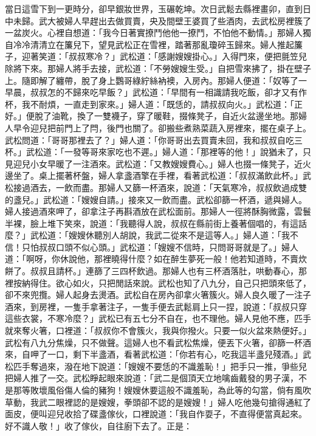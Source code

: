 \begin{showcontents}{}
當日這雪下到一更時分，卻早銀妝世界，玉碾乾坤。次日武鬆去縣裡畫卯，直到日中未歸。武大被婦人早趕出去做買賣，央及間壁王婆買了些酒肉，去武松房裡簇了一盆炭火。心裡自想道：「我今日著實撩鬥他他一撩鬥，不怕他不動情。」那婦人獨自冷冷清清立在簾兒下，望見武松正在雪裡，踏著那亂瓊碎玉歸來。婦人推起簾子，迎著笑道：「叔叔寒冷？」武松道：「感謝嫂嫂掛心。」入得門來，便把氈笠兒除將下來。那婦人將手去接，武松道：「不勞嫂嫂生受。」自把雪來拂了，掛在壁子上。隨即解了纏帶，脫了身上鸚哥綠紵絲衲襖，入房內。那婦人便道：「奴等了一早晨，叔叔怎的不歸來吃早飯？」武松道：「早間有一相識請我吃飯，卻才又有作杯，我不耐煩，一直走到家來。」婦人道：「既恁的，請叔叔向火。」武松道：「正好。」便脫了油靴，換了一雙襪子，穿了暖鞋，掇條凳子，自近火盆邊坐地。那婦人早令迎兒把前門上了閂，後門也關了。卻搬些煮熟菜蔬入房裡來，擺在桌子上。武松問道：「哥哥那裡去了？」婦人道：「你哥哥出去買賣未回，我和叔叔自吃三杯。」武松道：「一發等哥來家吃也不遲。」婦人道：「那裡等的他！」說猶未了，只見迎兒小女早暖了一注酒來。武松道：「又教嫂嫂費心。」婦人也掇一條凳子，近火邊坐了。桌上擺著杯盤，婦人拿盞酒擎在手裡，看著武松道：「叔叔滿飲此杯。」武松接過酒去，一飲而盡。那婦人又篩一杯酒來，說道：「天氣寒冷，叔叔飲過成雙的盞兒。」武松道：「嫂嫂自請。」接來又一飲而盡。武松卻篩一杯酒，遞與婦人。婦人接過酒來呷了，卻拿注子再斟酒放在武松面前。那婦人一徑將酥胸微露，雲鬟半裸，臉上堆下笑來，說道：「我聽得人說，叔叔在縣前街上養著個唱的，有這話麼？」武松道：「嫂嫂休聽別人胡說，我武二從來不是這等人。」婦人道：「我不信！只怕叔叔口頭不似心頭。」武松道：「嫂嫂不信時，只問哥哥就是了。」婦人道：「啊呀，你休說他，那裡曉得什麼？如在醉生夢死一般！他若知道時，不賣炊餅了。叔叔且請杯。」連篩了三四杯飲過。那婦人也有三杯酒落肚，哄動春心，那裡按納得住。欲心如火，只把閒話來說。武松也知了八九分，自己只把頭來低了，卻不來兜攬。婦人起身去燙酒。武松自在房內卻拿火箸簇火。婦人良久暖了一注子酒來，到房裡，一隻手拿著注子，一隻手便去武鬆肩上只一捏，說道：「叔叔只穿這些衣裳，不寒冷麼？」武松已有五七分不自在，也不理他。婦人見他不應，匹手就來奪火箸，口裡道：「叔叔你不會簇火，我與你撥火。只要一似火盆來熱便好。」武松有八九分焦燥，只不做聲。這婦人也不看武松焦燥，便丟下火箸，卻篩一杯酒來，自呷了一口，剩下半盞酒，看著武松道：「你若有心，吃我這半盞兒殘酒。」武松匹手奪過來，潑在地下說道：「嫂嫂不要恁的不識羞恥！」把手只一推，爭些兒把婦人推了一交。武松睜起眼來說道：「武二是個頂天立地噙齒戴發的男子漢，不是那等敗壞風俗傷人倫的豬狗！嫂嫂休要這般不識羞恥，為此等的勾當，倘有風吹草動，我武二眼裡認的是嫂嫂，拳頭卻不認的是嫂嫂！」婦人吃他幾句搶得通紅了面皮，便叫迎兒收拾了碟盞傢伙，口裡說道：「我自作耍子，不直得便當真起來。好不識人敬！」收了傢伙，自往廚下去了。正是：


\end{showcontents}
